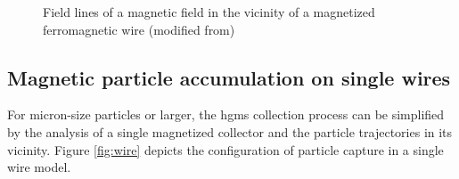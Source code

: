 \begin{figure}[H]
\centering
{}
\caption[Magnetic field in the vicinity of a wire]{Field lines of a magnetic field in the vicinity of a magnetized ferromagnetic wire (modified from\cite{FranzrebHabil})
\label{fig:mag_field_wire}
}
\end{figure}


\subsection{Magnetic particle accumulation on single wires}
\label{subsec:single_wire}
For micron-size particles or larger, the \gls{hgms} collection process can be simplified by the analysis of a single magnetized collector and the particle trajectories in its vicinity. Figure \ref{fig:wire} depicts the configuration of particle capture in a single wire model.

